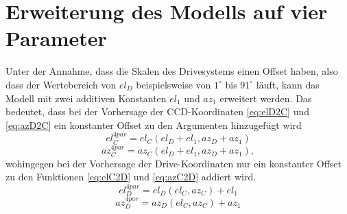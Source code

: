 \section{Erweiterung des Modells auf vier Parameter}
\label{se:4par}
Unter der Annahme, dass die Skalen des Drivesystems einen Offset haben, also dass der Wertebereich von $el_D$ beispielsweise von $1^{\circ}$ bis $91^{\circ}$ läuft, kann das Modell mit zwei additiven Konstanten $el_1$ und $az_1$ erweitert werden. Das bedeutet, dass bei der Vorhersage der CCD-Koordinaten \ref{eq:elD2C} und \ref{eq:azD2C} ein konstanter Offset zu den Argumenten hinzugefügt wird
\begin{equation}
el_C^{4par}=el_C(el_D+el_1,az_D+az_1)
\label{eq:elD2C4}
\end{equation}
\begin{equation}
az_C^{4par}=az_C(el_D+el_1,az_D+az_1),
\label{eq:azD2C4}
\end{equation}
wohingegen bei der Vorhersage der Drive-Koordinaten nur ein konstanter Offset zu den Funktionen \ref{eq:elC2D} und \ref{eq:azC2D} addiert wird.
\begin{equation}
el_D^{4par}=el_D(el_C,az_C)+el_1
\label{eq:elC2D4}
\end{equation}
\begin{equation}
az_D^{4par}=az_D(el_C,az_C)+az_1
\label{eq:azC2D4}
\end{equation}